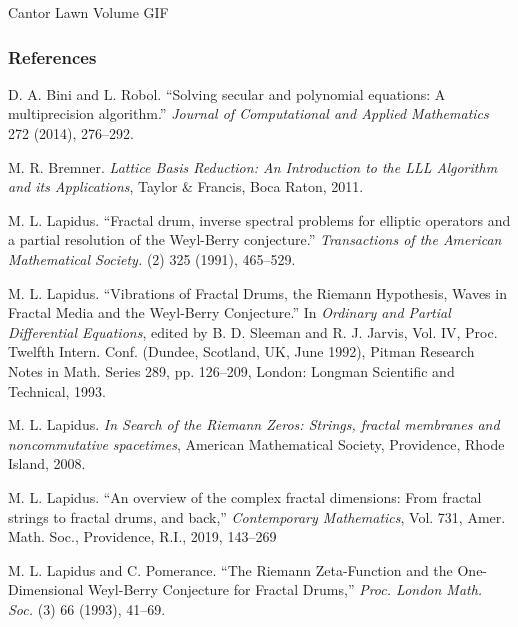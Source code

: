 \documentclass{if-beamer}
\begin{document}
\begin{frame}{Cantor Lawn Volume GIF}
	\begin{center}
	\end{center}
\end{frame}

\begin{frame}[allowframebreaks]
\frametitle{References}

\begin{thebibliography}{1}

D. A. Bini and L. Robol.
``Solving secular and polynomial equations: A multiprecision algorithm.'' 
\textit{Journal of Computational and Applied Mathematics}
272
(2014),
276--292.

M. R. Bremner.
\textit{Lattice Basis Reduction: An Introduction to the LLL Algorithm and its Applications},
Taylor \& Francis, Boca Raton, 2011.

M. L. Lapidus.
``Fractal drum, inverse spectral problems for elliptic operators and a partial resolution of the Weyl-Berry conjecture.'' 
\textit{Transactions of the American Mathematical Society.}
(2)
325
(1991),
465--529.
 
M. L. Lapidus.
``Vibrations of Fractal Drums, the Riemann Hypothesis, Waves in Fractal Media and the Weyl-Berry Conjecture.'' In \textit{Ordinary and Partial Differential Equations}, edited by B. D. Sleeman and R. J. Jarvis, Vol. IV, Proc. Twelfth Intern. Conf. (Dundee, Scotland, UK, June 1992), Pitman Research Notes in Math. Series 289, pp. 126--209, London: Longman Scientific and Technical, 1993.

M. L. Lapidus.
\textit{In Search of the Riemann Zeros: Strings, fractal membranes and noncommutative spacetimes}, 
American Mathematical Society, Providence, Rhode Island, 2008.

M. L. Lapidus.
``An overview of the complex fractal dimensions: From fractal strings to fractal drums, and back,'' \textit{Contemporary Mathematics}, Vol. 731, Amer. Math. Soc., Providence, R.I., 2019, 143--269

M. L. Lapidus and C. Pomerance.
``The Riemann Zeta-Function and the One-Dimensional Weyl-Berry Conjecture for Fractal Drums,''
\textit{Proc. London Math. Soc.}
(3)
66
(1993),
41--69.


\end{thebibliography}
\end{frame}
\end{document}
